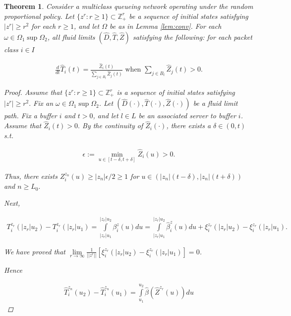 \documentclass[11pt]{article}
\newcommand{\Z}{\mathbb{Z}}
\newtheorem{theorem}{Theorem}
\theoremstyle{definition}
\numberwithin{equation}{section}
\begin{document}
\begin{theorem}
Consider a multiclass queueing network operating under the random proportional policy. Let $\{z^r:r\geq 1\}\subset \Z^r_+$ be a sequence of initial states satisfying $|z^r|\geq r^2$ for each $r\geq 1$, and let $\Omega$ be as in Lemma \ref{lem:conv}. For each $\omega\in \Omega_1 \sup \Omega_2$, all fluid limits $(\hat D, \hat T, \hat Z)$ satisfying the following: for each packet class $i\in I$

\begin{align}
\frac{d}{dt}\hat T_i(t) = \frac{\hat Z_i(t)}{\sum\limits_{j\in B_l} \hat Z_j(t)}\text{ when }
\sum\limits_{j\in B_l} \hat Z_j(t)>0.
\end{align}



\begin{proof}

Assume that $\{z^r:r\geq 1\}\subset \Z_+^r$ is a sequence of initial states satisfying $|z^r|\geq r^2.$ Fix an $\omega \in \Omega_1\sup \Omega_2$. Let $(\hat D(\cdot), \hat T(\cdot), \hat Z(\cdot))$ be a fluid limit path. Fix a buffer $i$ and $t>0$, and let $l\in L$ be an associated server to buffer $i$. Assume that $\hat Z_i(t)>0.$ By the continuity of $\hat Z_i(\cdot)$, there exists a $\delta\in (0, t)$ s.t. 

\begin{align}
\epsilon:=\min\limits_{u\in [t-\delta, t+\delta]}\hat Z_i(u)>0. 
\end{align}

Thus, there exists $Z_i^{z_n}(u)\geq |z_n|\epsilon/2\geq 1$ for $u\in (|z_n|(t-\delta), |z_n|(t+\delta))$ and $n\geq L_0.$

Next,


\begin{align}
T_i^{z_r}(|z_r|u_2) - T_i^{z_r}(|z_r|u_1) = \int \limits_{|z_r|u_1}^{|z_r|u_2}  \beta_i^z(u) du= \int \limits_{|z_r|u_1}^{|z_r|u_2}  \hat \beta_i^z(u) du+ \xi_i^{z_r} (|z_r|u_2) -  \xi_i^{z_r}(|z_r|u_1).
\end{align}



We have proved that $\lim\limits_{r\rightarrow \infty} \frac{1}{||z^r||}\left[ \xi_i^{z_r} (|z_r|u_2) -  \xi_i^{z_r}(|z_r|u_1) \right]= 0$.


Hence

\begin{align}
\hat T_i^{z_n}(u_2) - \hat T_i^{z_n}(u_1) = \int\limits_{u_1}^{u_2} \hat \beta (\hat Z^{z_r}(u))du 
\end{align}
\end{proof}
\end{theorem}
\end{document}
